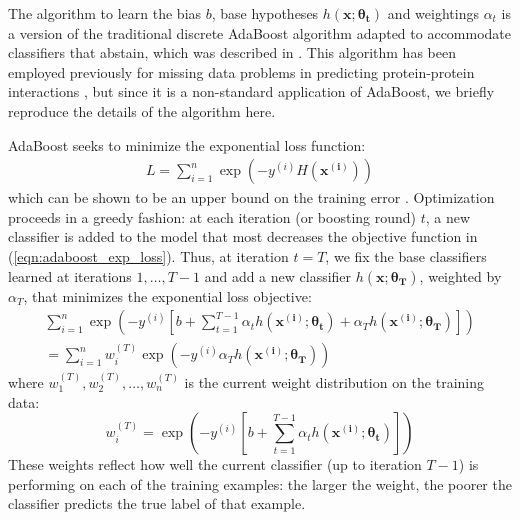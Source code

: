 \documentclass[
   technote
]{phildoc}
\begin{document}
The algorithm to learn the bias $b$, base hypotheses $h(\bm{x};\bm{\theta_t})$ and weightings $\alpha_t$ is a version of the traditional discrete AdaBoost algorithm adapted to accommodate classifiers that abstain, which was described in \cite{Schapire:1999}. This algorithm has been employed previously for missing data problems in predicting protein-protein interactions \cite{Smeraldi:2010}, but since it is a non-standard application of AdaBoost, we briefly reproduce the details of the algorithm here.

AdaBoost seeks to minimize the exponential loss function:
\begin{eqnarray}
L = \sum_{i=1}^n \exp\left(-y^{(i)} H(\bm{x^{(i)}})\right)
\label{eqn:adaboost_exp_loss}
\end{eqnarray}
which can be shown to be an upper bound on the training error \cite{Freund:2009}.  Optimization proceeds in a greedy fashion: at each iteration (or boosting round) $t$, a new classifier is added to the model that most decreases the objective function in (\ref{eqn:adaboost_exp_loss}).  Thus, at iteration $t=T$, we fix the base classifiers learned at iterations $1,\dots,T-1$ and add a new classifier $h(\bm{x}; \bm{\theta_T})$, weighted by $\alpha_T$, that minimizes the exponential loss objective:
\begin{eqnarray}
\sum_{i=1}^n \exp\left(-y^{(i)}\left[b + \sum_{t=1}^{T-1} \alpha_t h(\bm{x^{(i)}}; \bm{\theta_t}) + \alpha_{T} h(\bm{x^{(i)}}; \bm{\theta_T})\right]\right) \\
= \sum_{i=1}^n w_i^{(T)} \exp\left(-y^{(i)} \alpha_T h(\bm{x^{(i)}}; \bm{\theta_T})\right) \label{eqn:adaboost_T}
\end{eqnarray}
where $w_1^{(T)},w_2^{(T)},\dots,w_n^{(T)}$ is the current weight distribution on the training data:
\begin{equation}
w_i^{(T)} = \exp\left(-y^{(i)}\left[b + \sum_{t=1}^{T-1} \alpha_t h(\bm{x^{(i)}}; \bm{\theta_t})\right]\right)
\end{equation}
These weights reflect how well the current classifier (up to iteration $T-1$) is performing on each of the training examples:  the larger the weight, the poorer the classifier predicts the true label of that example.
\end{document}
